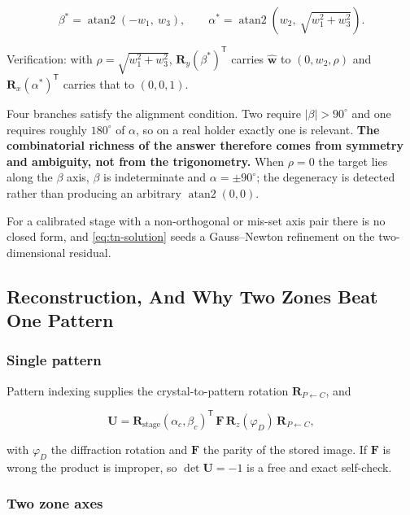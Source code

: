 \begin{equation}
\beta^{*} = \operatorname{atan2}(-w_1,\ w_3),
\qquad
\alpha^{*} = \operatorname{atan2}\!\left(w_2,\ \sqrt{w_1^2 + w_3^2}\right).
\label{eq:tn-solution}
\end{equation}

Verification: with $\rho = \sqrt{w_1^2 + w_3^2}$, $\mathbf{R}_y(\beta^{*})^{\mathsf T}$ carries
$\hat{\mathbf{w}}$ to $(0, w_2, \rho)$ and $\mathbf{R}_x(\alpha^{*})^{\mathsf T}$ carries that to
$(0,0,1)$.

Four branches satisfy the alignment condition. Two require $\lvert\beta\rvert > 90^{\circ}$ and one
requires roughly $180^{\circ}$ of $\alpha$, so on a real holder exactly one is relevant.
\textbf{The combinatorial richness of the answer therefore comes from symmetry and ambiguity, not
from the trigonometry.} When $\rho = 0$ the target lies along the $\beta$ axis, $\beta$ is
indeterminate and $\alpha = \pm 90^{\circ}$; the degeneracy is detected rather than producing an
arbitrary $\operatorname{atan2}(0,0)$.

For a calibrated stage with a non-orthogonal or mis-set axis pair there is no closed form, and
\eqref{eq:tn-solution} seeds a Gauss--Newton refinement on the two-dimensional residual.

\subsection{Reconstruction, And Why Two Zones Beat One Pattern}

\subsubsection{Single pattern}

Pattern indexing supplies the crystal-to-pattern rotation $\mathbf{R}_{P \leftarrow C}$, and

\begin{equation}
\mathbf{U} = \mathbf{R}_{\text{stage}}(\alpha_c,\beta_c)^{\mathsf T}\,
             \mathbf{F}\,\mathbf{R}_z(\varphi_D)\,\mathbf{R}_{P \leftarrow C},
\label{eq:tn-mode-a}
\end{equation}

with $\varphi_D$ the diffraction rotation and $\mathbf{F}$ the parity of the stored image. If
$\mathbf{F}$ is wrong the product is improper, so $\det \mathbf{U} = -1$ is a free and exact
self-check.

\subsubsection{Two zone axes}

